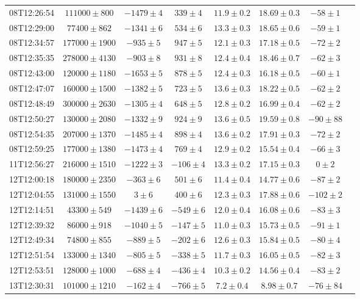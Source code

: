 \begin{table}
\begin{tabular}{lcccccc p{\columnwidth}}
08T12:26:54 &  $111000 \pm  800$ & $-1479 \pm 4$  & $  339 \pm 4$  &  $ 11.9 \pm 0.2$ &  $ 18.69 \pm 0.3$ & $ -58 \pm 1$ \\
08T12:29:00 &  $ 77400 \pm  862$ & $-1341 \pm 6$  & $  534 \pm 6$  &  $ 13.3 \pm 0.3$ &  $ 18.65 \pm 0.6$ & $ -59 \pm 1$ \\
08T12:34:57 &  $177000 \pm 1900$ & $ -935 \pm 5$  & $  947 \pm 5$  &  $ 12.1 \pm 0.3$ &  $ 17.18 \pm 0.5$ & $ -72 \pm 2$ \\
08T12:35:35 &  $278000 \pm 4130$ & $ -903 \pm 8$  & $  931 \pm 8$  &  $ 12.4 \pm 0.4$ &  $ 18.46 \pm 0.7$ & $ -62 \pm 3$ \\
08T12:43:00 &  $120000 \pm 1180$ & $-1653 \pm 5$  & $  878 \pm 5$  &  $ 12.4 \pm 0.3$ &  $ 16.18 \pm 0.5$ & $ -60 \pm 1$ \\
08T12:47:07 &  $160000 \pm 1500$ & $-1382 \pm 5$  & $  723 \pm 5$  &  $ 13.6 \pm 0.3$ &  $ 18.22 \pm 0.5$ & $ -62 \pm 2$ \\
08T12:48:49 &  $300000 \pm 2630$ & $-1305 \pm 4$  & $  648 \pm 5$  &  $ 12.8 \pm 0.2$ &  $ 16.99 \pm 0.4$ & $ -62 \pm 2$ \\
08T12:50:27 &  $130000 \pm 2080$ & $-1332 \pm 9$  & $  924 \pm 9$  &  $ 13.6 \pm 0.5$ &  $ 19.59 \pm 0.8$ & $ -90 \pm 88$ \\
08T12:54:35 &  $207000 \pm 1370$ & $-1485 \pm 4$  & $  898 \pm 4$  &  $ 13.6 \pm 0.2$ &  $ 17.91 \pm 0.3$ & $ -72 \pm 2$ \\
08T12:59:25 &  $177000 \pm 1380$ & $-1473 \pm 4$  & $  769 \pm 4$  &  $ 12.9 \pm 0.2$ &  $ 15.54 \pm 0.4$ & $ -66 \pm 3$ \\
11T12:56:27 &  $216000 \pm 1510$ & $-1222 \pm 3$  & $ -106 \pm 4$  &  $ 13.3 \pm 0.2$ &  $ 17.15 \pm 0.3$ & $  0  \pm 2$ \\
12T12:00:18 &  $180000 \pm 2350$ & $ -363 \pm 6$  & $  501 \pm 6$  &  $ 11.4 \pm 0.4$ &  $ 14.77 \pm 0.6$ & $ -87 \pm 2$ \\
12T12:04:55 &  $131000 \pm 1550$ & $    3 \pm 6$  & $  400 \pm 6$  &  $ 12.3 \pm 0.3$ &  $ 17.88 \pm 0.6$ & $-102 \pm 2$ \\
12T12:14:51 &  $ 43300 \pm  549$ & $-1439 \pm 6$  & $ -549 \pm 6$  &  $ 12.0 \pm 0.4$ &  $ 16.08 \pm 0.6$ & $ -83 \pm 3$ \\
12T12:39:32 &  $ 86000 \pm  918$ & $-1040 \pm 5$  & $ -147 \pm 5$  &  $ 11.0 \pm 0.3$ &  $ 15.73 \pm 0.5$ & $ -91 \pm 1$ \\
12T12:49:34 &  $ 74800 \pm  855$ & $ -889 \pm 5$  & $ -202 \pm 6$  &  $ 12.6 \pm 0.3$ &  $ 15.84 \pm 0.5$ & $ -80 \pm 4$ \\
12T12:51:54 &  $133000 \pm 1340$ & $ -805 \pm 5$  & $ -338 \pm 5$  &  $ 11.7 \pm 0.3$ &  $ 16.05 \pm 0.5$ & $ -82 \pm 3$ \\
12T12:53:51 &  $128000 \pm 1000$ & $ -688 \pm 4$  & $ -436 \pm 4$  &  $ 10.3 \pm 0.2$ &  $ 14.56 \pm 0.4$ & $ -83 \pm 2$ \\
13T12:30:31 &  $101000 \pm 1210$ & $ -162 \pm 4$  & $ -766 \pm 5$  &  $  7.2 \pm 0.4$ &  $  8.98 \pm 0.7$ & $ -76 \pm 84$ \\
\bottomrule

\end{tabular}

\end{table}
